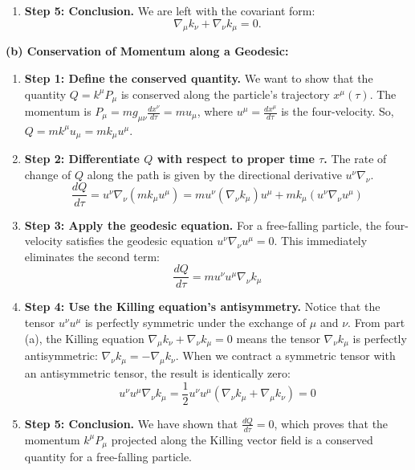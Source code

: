 \begin{solution}
\begin{enumerate}
    \item \textbf{Step 5: Conclusion.}
    We are left with the covariant form:
    \[ \nabla_\mu k_\nu + \nabla_\nu k_\mu = 0. \]
\end{enumerate}

\textbf{(b) Conservation of Momentum along a Geodesic:}
\begin{enumerate}
    \item \textbf{Step 1: Define the conserved quantity.}
    We want to show that the quantity $Q = k^\mu P_\mu$ is conserved along the particle's trajectory $x^\mu(\tau)$.
    The momentum is $P_\mu = m g_{\mu\nu} \frac{dx^\nu}{d\tau} = m u_\mu$, where $u^\mu = \frac{dx^\mu}{d\tau}$ is the four-velocity.
    So, $Q = m k^\mu u_\mu = m k_\mu u^\mu$.
    
    \item \textbf{Step 2: Differentiate $Q$ with respect to proper time $\tau$.}
    The rate of change of $Q$ along the path is given by the directional derivative $u^\nu \nabla_\nu$.
    \[ \frac{dQ}{d\tau} = u^\nu \nabla_\nu (m k_\mu u^\mu) = m u^\nu (\nabla_\nu k_\mu) u^\mu + m k_\mu (u^\nu \nabla_\nu u^\mu) \]
    
    \item \textbf{Step 3: Apply the geodesic equation.}
    For a free-falling particle, the four-velocity satisfies the geodesic equation $u^\nu \nabla_\nu u^\mu = 0$.
    This immediately eliminates the second term:
    \[ \frac{dQ}{d\tau} = m u^\nu u^\mu \nabla_\nu k_\mu \]
    
    \item \textbf{Step 4: Use the Killing equation's antisymmetry.}
    Notice that the tensor $u^\nu u^\mu$ is perfectly symmetric under the exchange of $\mu$ and $\nu$.
    From part (a), the Killing equation $\nabla_\mu k_\nu + \nabla_\nu k_\mu = 0$ means the tensor $\nabla_\nu k_\mu$ is perfectly antisymmetric: $\nabla_\nu k_\mu = -\nabla_\mu k_\nu$.
    When we contract a symmetric tensor with an antisymmetric tensor, the result is identically zero:
    \[ u^\nu u^\mu \nabla_\nu k_\mu = \frac{1}{2} u^\nu u^\mu (\nabla_\nu k_\mu + \nabla_\mu k_\nu) = 0 \]
    
    \item \textbf{Step 5: Conclusion.}
    We have shown that $\frac{dQ}{d\tau} = 0$, which proves that the momentum $k^\mu P_\mu$ projected along the Killing vector field is a conserved quantity for a free-falling particle.
\end{enumerate}
\end{solution}

